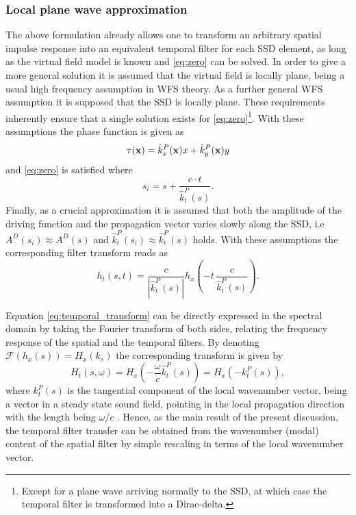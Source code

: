 \documentclass[conference]{IEEEtran}
\begin{document}
\subsubsection{Local plane wave approximation}
The above formulation already allows one to transform an arbitrary spatial impulse response into an equivalent temporal filter for each SSD element, as long as the virtual field model is known and \eqref{eq:zero} can be solved.
In order to give a more general solution it is assumed that the virtual field is locally plane, being a usual high frequency assumption in WFS theory.
As a further general WFS assumption it is supposed that the SSD is locally plane.
These requirements inherently ensure that a single solution exists for \eqref{eq:zero}\footnote{Except for a plane wave arriving normally to the SSD, at which case the temporal filter is transformed into a Dirac-delta.}.
With these assumptions the phase function is given as
\begin{equation}
    \tau(\mathbf{x}) = \hat{k}^P_x(\mathbf{x})x +  \hat{k}^P_y(\mathbf{x}) y
\end{equation}
and \eqref{eq:zero} is satisfied where
\begin{equation}
    s_i = s + \frac{c \cdot t}{\hat{k}_t^P(s)}
    .
\end{equation}
Finally, as a crucial approximation it is assumed that both the amplitude of the driving function and the propagation vector varies slowly along the SSD, i.e $A^D(s_i) \approx A^D(s)$ and $\hat{k}_t^P(s_i) \approx \hat{k}_t^P(s)$ holds.
With these assumptions the corresponding filter transform reads as
\begin{equation}
    h_t\left(s,t\right) =\frac{ c }{|\hat{k}_t^P(s)|} h_x\left(-t \,\frac{c}{\hat{k}_t^P(s)}\right).
    \label{eq:temporal_transform}
\end{equation}

Equation \eqref{eq:temporal_transform} can be directly expressed in the spectral domain by taking the Fourier transform of both sides, relating the frequency response of the spatial and the temporal filters.
By denoting $\mathcal{F}\left( h_x(s)\right) = H_x(k_s)$ the corresponding transform is given by
\begin{equation}
    H_t\left(s,\omega\right) = H_x\left(-\frac{\omega}{c}\hat{k}_t^P(s)\right) = H_x\left(-k_t^P(s)\right),
    \label{eq:frequency_transform}
\end{equation}
where $k_t^P(s)$ is the tangential component of the local wavenumber vector, being a vector in a steady state sound field, pointing in the local propagation direction with the length being $\omega/c$ \cite{Firtha2019phd}.
Hence, as the main result of the present discussion, the temporal filter transfer can be obtained from the wavenumber (modal) content of the spatial filter by simple rescaling in terms of the local wavenumber vector.
\end{document}
